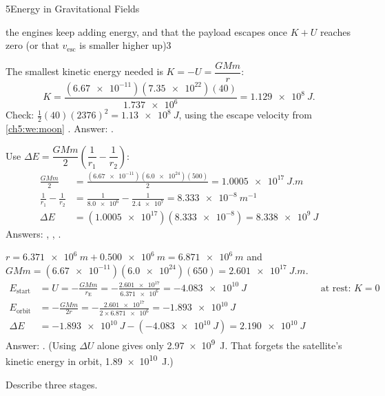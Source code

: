 \begin{chapteranswers}{5}{Energy in Gravitational Fields}
\begin{markingcriteria}
{            the engines keep adding energy, and that the payload escapes once
            $K + U$ reaches zero (or that $v_\mathrm{esc}$ is smaller higher up)}{3}
        \end{markingcriteria}
  \item The smallest kinetic energy needed is $K = -U = \dfrac{GMm}{r}$:
        \[ K = \frac{(\num{6.67e-11})(\num{7.35e22})(40)}{\num{1.737e6}} = \qty{1.129e8}{J}. \]
        Check: $\tfrac{1}{2}(40)(2376)^2 = \qty{1.13e8}{J}$, using the escape
        velocity from \cref{ch5:we:moon} \cmark.
        Answer: .
  \item Use $\Delta E = \dfrac{GMm}{2}\left(\dfrac{1}{r_1} - \dfrac{1}{r_2}\right)$:
        \begin{align*}
          \frac{GMm}{2} &= \frac{(\num{6.67e-11})(\num{6.0e24})(500)}{2} = \qty{1.0005e17}{J.m}\\
          \frac{1}{r_1} - \frac{1}{r_2} &= \frac{1}{\num{8.0e6}} - \frac{1}{\num{2.4e7}} = \qty{8.333e-8}{m^{-1}}\\
          \Delta E &= (\num{1.0005e17})(\num{8.333e-8}) = \qty{8.338e9}{J}
        \end{align*}
        Answers: ,
        ,
        .
  \item $r = \qty{6.371e6}{m} + \qty{0.500e6}{m} = \qty{6.871e6}{m}$ and
        $GMm = (\num{6.67e-11})(\num{6.0e24})(650) = \qty{2.601e17}{J.m}$.
        \begin{align*}
          E_\text{start} &= U = -\frac{GMm}{r_\mathrm{E}} = -\frac{\num{2.601e17}}{\num{6.371e6}}
              = \qty{-4.083e10}{J} && \text{at rest: } K = 0\\
          E_\text{orbit} &= -\frac{GMm}{2r} = -\frac{\num{2.601e17}}{2 \times \num{6.871e6}}
              = \qty{-1.893e10}{J}\\
          \Delta E &= \qty{-1.893e10}{J} - (\qty{-4.083e10}{J}) = \qty{2.190e10}{J}
        \end{align*}
        Answer: . (Using $\Delta U$ alone gives
        only \qty{2.97e9}{J}. That forgets the satellite's kinetic energy in orbit,
        \qty{1.89e10}{J}.)
  \item Describe three stages.

\end{chapteranswers}
